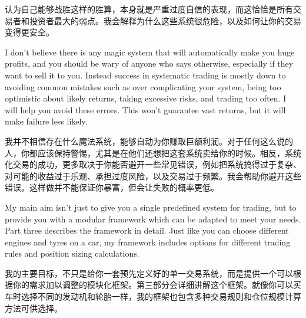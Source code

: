 \begin{chineseblock}认为自己能够战胜这样的胜算，本身就是严重过度自信的表现，而这恰恰是所有交易者和投资者最大的弱点。我会解释为什么这些系统很危险，以及如何让你的交易变得更安全。\end{chineseblock}


\begin{englishblock} I don't believe there is any magic system that will automatically make you huge profits, and you should be wary of anyone who says otherwise, especially if they want to sell it to you. Instead success in systematic trading is mostly down to avoiding common mistakes such as over complicating your system, being too optimistic about likely returns, taking excessive risks, and trading too often. I will help you avoid these errors. This won't guarantee vast returns, but it will make failure less likely. \end{englishblock}

\begin{chineseblock}我并不相信存在什么魔法系统，能够自动为你赚取巨额利润。对于任何这么说的人，你都应该保持警惕，尤其是在他们还想把这套系统卖给你的时候。相反，系统化交易的成功，更多取决于你能否避开一些常见错误，例如把系统搞得过于复杂、对可能的收益过于乐观、承担过度风险，以及交易过于频繁。我会帮助你避开这些错误。这样做并不能保证你暴富，但会让失败的概率更低。\end{chineseblock}

\bipairgap

\begin{englishblock} My main aim isn't just to give you a single predefined system for trading, but to provide you with a modular framework which can be adapted to meet your needs. Part three describes the framework in detail. Just like you can choose different engines and tyres on a car, my framework includes options for different trading rules and position sizing calculations. \end{englishblock}

\begin{chineseblock}我的主要目标，不只是给你一套预先定义好的单一交易系统，而是提供一个可以根据你的需求加以调整的模块化框架。第三部分会详细讲解这个框架。就像你可以买车时选择不同的发动机和轮胎一样，我的框架也包含多种交易规则和仓位规模计算方法可供选择。\end{chineseblock}

\bipairgap

